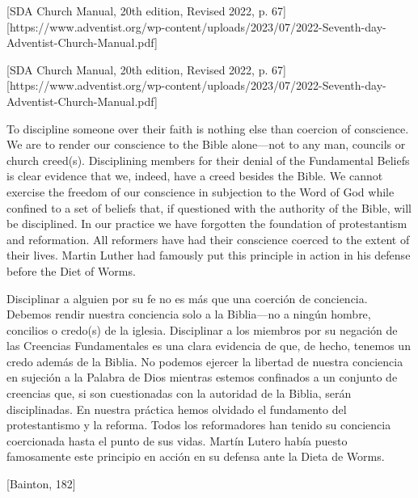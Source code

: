 

[SDA Church Manual, 20th edition, Revised 2022, p. 67][https://www.adventist.org/wp-content/uploads/2023/07/2022-Seventh-day-Adventist-Church-Manual.pdf]


[SDA Church Manual, 20th edition, Revised 2022, p. 67][https://www.adventist.org/wp-content/uploads/2023/07/2022-Seventh-day-Adventist-Church-Manual.pdf]


To discipline someone over their faith is nothing else than coercion of conscience. We are to render our conscience to the Bible alone—not to any man, councils or church creed(s). Disciplining members for their denial of the Fundamental Beliefs is clear evidence that we, indeed, have a creed besides the Bible. We cannot exercise the freedom of our conscience in subjection to the Word of God while confined to a set of beliefs that, if questioned with the authority of the Bible, will be disciplined. In our practice we have forgotten the foundation of protestantism and reformation. All reformers have had their conscience coerced to the extent of their lives. Martin Luther had famously put this principle in action in his defense before the Diet of Worms.


Disciplinar a alguien por su fe no es más que una coerción de conciencia. Debemos rendir nuestra conciencia solo a la Biblia—no a ningún hombre, concilios o credo(s) de la iglesia. Disciplinar a los miembros por su negación de las Creencias Fundamentales es una clara evidencia de que, de hecho, tenemos un credo además de la Biblia. No podemos ejercer la libertad de nuestra conciencia en sujeción a la Palabra de Dios mientras estemos confinados a un conjunto de creencias que, si son cuestionadas con la autoridad de la Biblia, serán disciplinadas. En nuestra práctica hemos olvidado el fundamento del protestantismo y la reforma. Todos los reformadores han tenido su conciencia coercionada hasta el punto de sus vidas. Martín Lutero había puesto famosamente este principio en acción en su defensa ante la Dieta de Worms.


[Bainton, 182]


